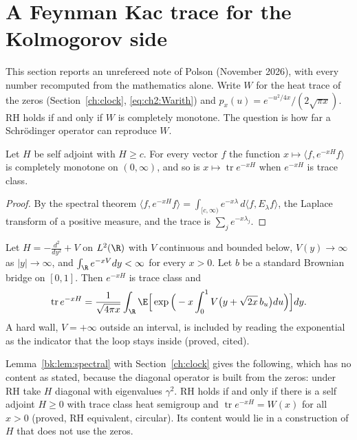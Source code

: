 \section{A Feynman Kac trace for the Kolmogorov side}\label{bk:sec:fk}

This section reports an unrefereed note of Polson (November 2026), with every number recomputed from the mathematics alone. Write $W$ for the heat trace of the zeros (Section~\ref{ch:clock}, \eqref{eq:ch2:Warith}) and $p_x(u)=e^{-u^2/4x}/(2\sqrt{\pi x})$. RH holds if and only if $W$ is completely monotone. The question is how far a Schr\"odinger operator can reproduce $W$.

\begin{lemma}\label{bk:lem:spectral}
Let $H$ be self adjoint with $H\ge c$. For every vector $f$ the function $x\mapsto\langle f,e^{-xH}f\rangle$ is completely monotone on $(0,\infty)$, and so is $x\mapsto\operatorname{tr}e^{-xH}$ when $e^{-xH}$ is trace class.
\end{lemma}

\begin{proof}
By the spectral theorem $\langle f,e^{-xH}f\rangle=\int_{[c,\infty)}e^{-x\lambda}\,d\langle f,E_\lambda f\rangle$, the Laplace transform of a positive measure, and the trace is $\sum_je^{-x\lambda_j}$.
\end{proof}

\begin{theorem}\label{bk:thm:fktrace}
Let $H=-\frac{d^2}{dy^2}+V$ on $L^2(\R)$ with $V$ continuous and bounded below, $V(y)\to\infty$ as $|y|\to\infty$, and $\int_{\R}e^{-xV}dy<\infty$ for every $x>0$. Let $b$ be a standard Brownian bridge on $[0,1]$. Then $e^{-xH}$ is trace class and
\[
\operatorname{tr}e^{-xH}=\frac1{\sqrt{4\pi x}}\int_{\R}\E\Big[\exp\Big(-x\int_0^1V\big(y+\sqrt{2x}\,b_u\big)du\Big)\Big]dy.
\]
A hard wall, $V=+\infty$ outside an interval, is included by reading the exponential as the indicator that the loop stays inside (proved, cited).
\end{theorem}

Lemma~\ref{bk:lem:spectral} with Section~\ref{ch:clock} gives the following, which has no content as stated, because the diagonal operator is built from the zeros: under RH take $H$ diagonal with eigenvalues $\gamma^2$. RH holds if and only if there is a self adjoint $H\ge0$ with trace class heat semigroup and $\operatorname{tr}e^{-xH}=W(x)$ for all $x>0$ (proved, RH equivalent, circular). Its content would lie in a construction of $H$ that does not use the zeros.

